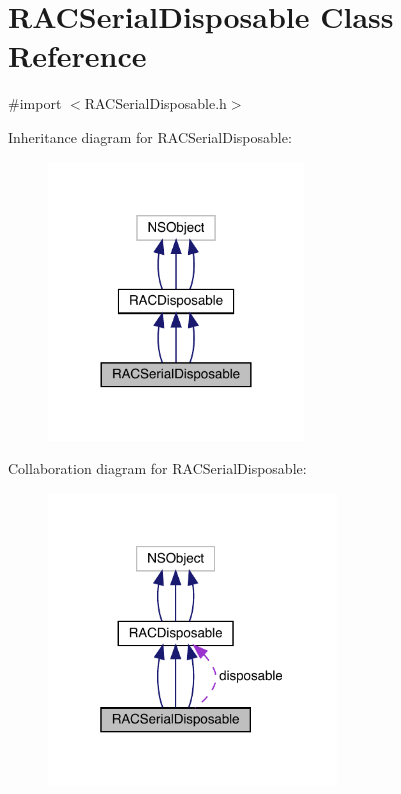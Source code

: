 \hypertarget{interface_r_a_c_serial_disposable}{}\section{R\+A\+C\+Serial\+Disposable Class Reference}
\label{interface_r_a_c_serial_disposable}


{\ttfamily \#import $<$R\+A\+C\+Serial\+Disposable.\+h$>$}



Inheritance diagram for R\+A\+C\+Serial\+Disposable\+:\nopagebreak
\begin{figure}[H]
\begin{center}
\leavevmode
\includegraphics[width=192pt]{interface_r_a_c_serial_disposable__inherit__graph}
\end{center}
\end{figure}


Collaboration diagram for R\+A\+C\+Serial\+Disposable\+:\nopagebreak
\begin{figure}[H]
\begin{center}
\leavevmode
\includegraphics[width=217pt]{interface_r_a_c_serial_disposable__coll__graph}
\end{center}
\end{figure}
